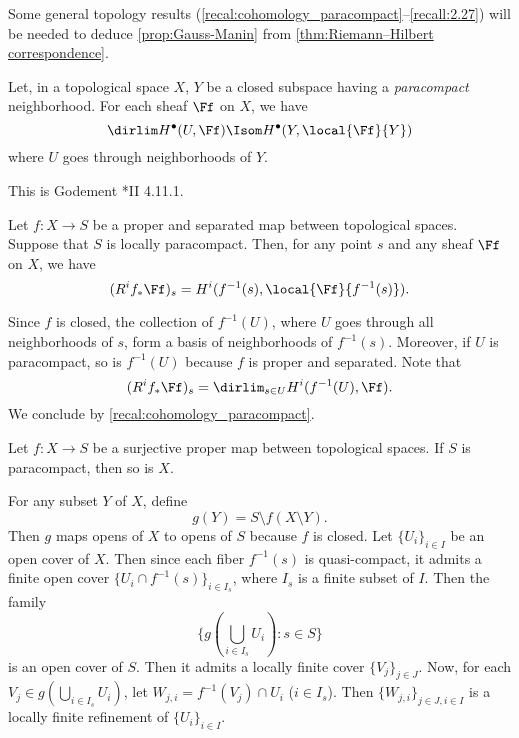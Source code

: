 Some general topology results
(\ref{recal:cohomology_paracompact}--\ref{recall:2.27})
will be needed to deduce
\ref{prop:Gauss-Manin} from \ref{thm:Riemann–Hilbert correspondence}.

\begin{recall}\label{recal:cohomology_paracompact}
  Let, in a topological space $X$, $Y$ be a closed subspace having a
  \emph{paracompact} neighborhood. For each sheaf $\Ff$ on $X$, we have
  \[
  \dirlim H^\bullet(U,\Ff)\Isom H^\bullet(Y,\local{\Ff}{Y})
  \]
  where $U$ goes through neighborhoods of $Y$.
\end{recall}

This is Godement {\cite{Godement}*{II 4.11.1}}.

\begin{corollary}\label{cor:stalk_Rf}
  Let $f\colon X\to S$ be a proper and separated map between topological spaces.
  Suppose that $S$ is locally paracompact. Then, for any point $s$ and any sheaf
  $\Ff$ on $X$, we have
  \[
  (R^if_{\ast}\Ff)_s = H^i(f^{-1}(s),\local{\Ff}{f^{-1}(s)}).
  \]
\end{corollary}

Since $f$ is closed, the collection of $f^{-1}(U)$, where $U$ goes through all
neighborhoods of $s$, form a basis of neighborhoods of $f^{-1}(s)$. Moreover,
if $U$ is paracompact, so is $f^{-1}(U)$ because $f$ is proper and separated.
Note that
\[
(R^if_{\ast}\Ff)_s = \dirlim_{s \in U}H^i(f^{-1}(U),\Ff).
\]
We conclude by \ref{recal:cohomology_paracompact}.

\begin{sublemma}
  Let $f\colon X\to S$ be a surjective proper map between topological spaces.
  If $S$ is paracompact, then so is $X$.
\end{sublemma}

For any subset $Y$ of $X$, define
\[
g(Y) = S\setminus f(X\setminus Y).
\]
Then $g$ maps opens of $X$ to opens of $S$ because $f$ is closed.
Let $\{U_i\}_{i\in I}$ be an open cover of $X$. Then since each fiber
$f^{-1}(s)$ is quasi-compact, it admits a finite open cover
$\{U_i\cap f^{-1}(s)\}_{i\in I_s}$, where $I_s$ is a finite subset of $I$.
Then the family
\[
\Big\{ g(\bigcup_{i\in I_s} U_i) : s\in S \Big\}
\]
is an open cover of $S$. Then it admits a locally finite cover
$\{V_j\}_{j\in J}$. Now, for each $V_j\in g(\bigcup_{i\in I_s} U_i)$, let
$W_{j,i}=f^{-1}(V_j)\cap U_i$ ($i\in I_s$). Then $\{W_{j,i}\}_{j\in J,i\in I}$
is a locally finite refinement of $\{U_i\}_{i\in I}$.

